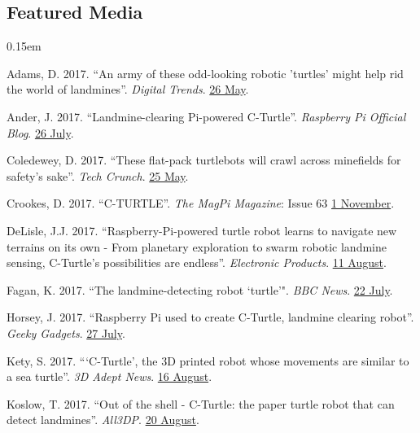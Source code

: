 \documentclass[12pt,a4paper]{article}
\begin{document}
	\subsection*{Featured Media}
		\begin{description}
			\itemsep0.15em
			\item Adams, D. 2017. ``An army of these odd-looking robotic 'turtles' might help rid the world of landmines''. \textit{Digital Trends}. \href{https://www.digitaltrends.com/cool-tech/robot-turtles-detect-landmines/}{26 May}.
			\item Ander, J. 2017. ``Landmine-clearing Pi-powered C-Turtle''. \textit{Raspberry Pi Official Blog}. \href{https://www.raspberrypi.org/blog/landmine-c-turtle/}{26 July}.
			\item Coledewey, D. 2017. ``These flat-pack turtlebots will crawl across minefields for safety's sake''. \textit{Tech Crunch}. \href{https://techcrunch.com/2017/05/25/these-flat-pack-turtlebots-will-crawl-across-minefields-for-safetys-sake/}{25 May}.
			\item Crookes, D. 2017. ``C-TURTLE''. \textit{The MagPi Magazine}: Issue 63 \href{https://www.raspberrypi.org/magpi/c-turtle/}{1 November}.
			\item DeLisle, J.J. 2017. ``Raspberry-Pi-powered turtle robot learns to navigate new terrains on its own - From planetary exploration to swarm robotic landmine sensing, C-Turtle's possibilities are endless''. \textit{Electronic Products}. \href{https://www.electronicproducts.com/Robotics/AI/Raspberry_Pi_powered_turtle_robot_learns_to_navigate_new_terrains_on_its_own.aspx}{11 August}.
			\item Fagan, K. 2017. ``The landmine-detecting robot `turtle'". \textit{BBC News}. \href{http://www.bbc.com/news/av/technology-40296297/the-soft-3d-printed-robot-that-could-come-to-the-rescue}{22 July}.
			\item Horsey, J. 2017. ``Raspberry Pi used to create C-Turtle, landmine clearing robot''. \textit{Geeky Gadgets}. \href{https://www.geeky-gadgets.com/landmine-clearing-robot-27-07-2017/}{27 July}.
			\item Kety, S. 2017. ```C-Turtle', the 3D printed robot whose movements are similar to a sea turtle''. \textit{3D Adept News}. \href{https://3dadept.com/c-turtle-the-3d-printed-robot-whose-movements-are-similar-to-a-sea-turtle/}{16 August}.
			\item Koslow, T. 2017. ``Out of the shell - C-Turtle: the paper turtle robot that can detect landmines''. \textit{All3DP}. \href{https://all3dp.com/landmine-detecting-robot-c-turtle/}{20 August}.

\end{description}
\end{document}
